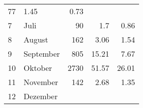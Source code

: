 \begin{longtable}{lXrrr}
       \num{77} &
       \num[round-mode=places,round-precision=2]{1.45} &
         \num[round-mode=places,round-precision=2]{0.73} \\

     7 &
     \multicolumn{1}{X}{ Juli   } &


       \num{90} &
       \num[round-mode=places,round-precision=2]{1.7} &
         \num[round-mode=places,round-precision=2]{0.86} \\

     8 &
     \multicolumn{1}{X}{ August   } &


       \num{162} &
       \num[round-mode=places,round-precision=2]{3.06} &
         \num[round-mode=places,round-precision=2]{1.54} \\

     9 &
     \multicolumn{1}{X}{ September   } &


       \num{805} &
       \num[round-mode=places,round-precision=2]{15.21} &
         \num[round-mode=places,round-precision=2]{7.67} \\

     10 &
     \multicolumn{1}{X}{ Oktober   } &


       \num{2730} &
       \num[round-mode=places,round-precision=2]{51.57} &
         \num[round-mode=places,round-precision=2]{26.01} \\

     11 &
     \multicolumn{1}{X}{ November   } &


       \num{142} &
       \num[round-mode=places,round-precision=2]{2.68} &
         \num[round-mode=places,round-precision=2]{1.35} \\

     12 &
     \multicolumn{1}{X}{ Dezember   } &



\end{longtable}
